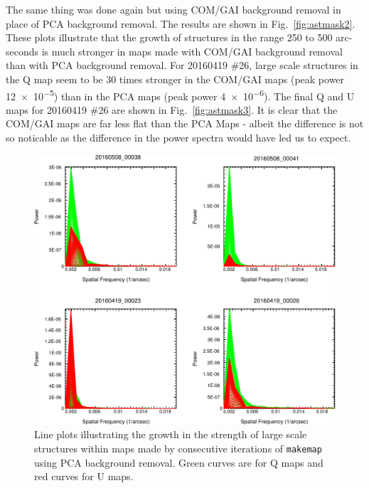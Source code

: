 \documentclass[twoside,11pt]{starlink}
\begin{document}
The same thing was done again but using COM/GAI background removal in
place of PCA background removal. The results are shown in
Fig.~\ref{fig:astmask2}. These plots illustrate that the growth of
structures in the range 250 to 500 arc-seconds is much stronger in
maps made with COM/GAI background removal than with PCA background
removal. For 20160419 \#26, large scale structures in the Q map seem to
be 30 times stronger in the COM/GAI maps (peak power \num{12e-5}) than
in the PCA maps (peak power \num{4e-6}). The final Q and U maps for
20160419 \#26 are shown in Fig.~\ref{fig:astmask3}. It is clear that the
COM/GAI maps are far less flat than the PCA Maps - albeit the difference
is not so noticable as the difference in the power spectra would have led
us to expect.

\begin{figure}
\includegraphics[width=\columnwidth]{astmask1}
\caption{Line plots illustrating the growth in the strength of large
scale structures within maps made by consecutive iterations of
\texttt{makemap} using PCA background removal. Green curves are for Q maps and red curves for U maps.}
\label{fig:astmask1}
\end{figure}
\end{document}
